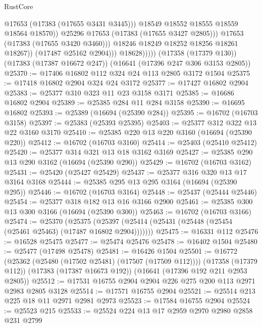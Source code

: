 \begin{lexlean}{RustCore}
\begin{coremodule}
                                @17653
                                (@17383 (@17655 @3431 @3445)))
                              @18549
                              @18552
                              @18555
                              @18559
                              @18564
                              @18570))
                          @25296
                          @17653
                          (@17383 (@17655 @3427 @2805)))
                        @17653
                        (@17383 (@17655 @3420 @3460)))
                      @18246
                      @18249
                      @18252
                      @18256
                      @18261
                      @18267))
                  (@17487 @25162 @2904)))
              @18628)))))
    (@17358 (@17379 @130))
    (@17383 (@17387 @16672 @247))
    (@16641 (@17396 @247 @306 @3153 @2805))
@25370 := @17406 @16802 @112 @324 @24 @113 @2805 @3172 @1504
@25375 := @17418 @16802 @2904 @324 @24 @3172
@25377 := @17427 @16802 @2904
@25383 := @25377 @310 @323 @11 @23 @3158 @3171
@25385 := @16686 @16802 @2904
@25389 := @25385 @284 @11 @284 @3158
@25390 := @16695 @16802
@25393 := @25389 (@16694 (@25390 @284))
@25395 := @16702 (@16703 @3158)
@25397 := @25383 (@25393 @25395)
@25403 := @25377 @312 @322 @13 @22 @3160 @3170
@25410 := @25385 @220 @13 @220 @3160 (@16694 (@25390 @220))
@25412 := @16702 (@16703 @3160)
@25414 := @25403 (@25410 @25412)
@25420 := @25377 @314 @321 @13 @18 @3162 @3169
@25427 := @25385 @290 @13 @290 @3162 (@16694 (@25390 @290))
@25429 := @16702 (@16703 @3162)
@25431 := @25420 (@25427 @25429)
@25437 := @25377 @316 @320 @13 @17 @3164 @3168
@25444 := @25385 @295 @13 @295 @3164 (@16694 (@25390 @295))
@25446 := @16702 (@16703 @3164)
@25448 := @25437 (@25444 @25446)
@25454 := @25377 @318 @182 @13 @16 @3166 @2900
@25461 := @25385 @300 @13 @300 @3166 (@16694 (@25390 @300))
@25463 := @16702 (@16703 @3166)
@25474 := @25370
    (@25375 (@25397 (@25414 (@25431 (@25448 (@25454 (@25461 @25463) (@17487 @16802 @2904)))))))
@25475 := @16331 @112
@25476 := @16528 @25475
@25477 := @25474 @25476
@25478 := @16402 @1504
@25480 := @25477 (@17498 @25478)
@25481 := @16426 @1504
@25501 := @16772
    (@25362 (@25480 (@17502 @25481) (@17507 (@17509 @112))))
    (@17358 (@17379 @112))
    (@17383 (@17387 @16673 @192))
    (@16641 (@17396 @192 @211 @2953 @2805))
@25512 := @17531 @16755 @2904 @2904 @226 @275 @200 @113 @2971 @2983 @2805 @3128
@25514 := @17571 @16755 @2904
@25521 := @25514 @213 @225 @18 @11 @2971 @2981 @2973
@25523 := @17584 @16755 @2904
@25524 := @25523 @215
@25533 := @25524 @224 @13 @17 @2959 @2970 @2980 @2858 @231 @2799

\end{coremodule}
\end{lexlean}
